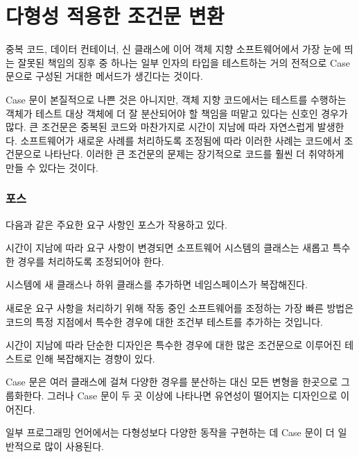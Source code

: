 \documentclass[a4paper,10pt,twoside]{book}
\begin{document}
	\renewcommand{\nnbb}[2]{} %
	\sloppy
\fi
\chapter{다형성 적용한 조건문 변환}

중복 코드, 데이터 컨테이너, 신 클래스에 이어 객체 지향 소프트웨어에서 가장 눈에 띄는 잘못된 책임의 징후 중 하나는 일부 인자의 타입을 테스트하는 거의 전적으로 Case 문으로 구성된 거대한 메서드가 생긴다는 것이다. 

Case 문이 본질적으로 나쁜 것은 아니지만, 객체 지향 코드에서는 테스트를 수행하는 객체가 테스트 대상 객체에 더 잘 분산되어야 할 책임을 떠맡고 있다는 신호인 경우가 많다. 큰 조건문은 중복된 코드와 마찬가지로 시간이 지남에 따라 자연스럽게 발생한다. 소프트웨어가 새로운 사례를 처리하도록 조정됨에 따라 이러한 사례는 코드에서 조건문으로 나타난다. 이러한 큰 조건문의 문제는 장기적으로 코드를 훨씬 더 취약하게 만들 수 있다는 것이다.

\subsection*{포스}

다음과 같은 주요한 요구 사항인 포스가 작용하고 있다.

\begin{bulletlist}
\item 시간이 지남에 따라 요구 사항이 변경되면 소프트웨어 시스템의 클래스는 새롭고 특수한 경우를 처리하도록 조정되어야 한다.

\item 시스템에 새 클래스나 하위 클래스를 추가하면 네임스페이스가 복잡해진다.

\item 새로운 요구 사항을 처리하기 위해 작동 중인 소프트웨어를 조정하는 가장 빠른 방법은 코드의 특정 지점에서 특수한 경우에 대한 조건부 테스트를 추가하는 것입니다.

\item 시간이 지남에 따라 단순한 디자인은 특수한 경우에 대한 많은 조건문으로 이루어진 테스트로 인해 복잡해지는 경향이 있다.

\item Case 문은 여러 클래스에 걸쳐 다양한 경우를 분산하는 대신 모든 변형을 한곳으로 그룹화한다. 그러나 Case 문이 두 곳 이상에 나타나면 유연성이 떨어지는 디자인으로 이어진다. 

\item 일부 프로그래밍 언어에서는 다형성보다 다양한 동작을 구현하는 데 Case 문이 더 일반적으로 많이 사용된다.
\end{bulletlist}
\end{document}
